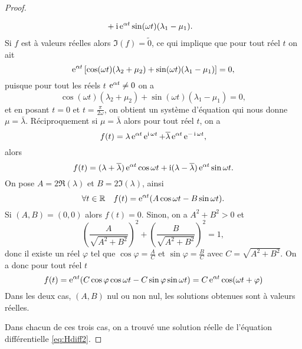 \begin{proof}
\begin{enumerate}
\begin{align}
            &+ \operatorname{i}\operatorname{e}^{\alpha t} \sin(\omega t)(\lambda_1-\mu_1).
      \end{align}
      Si \(f\) est à valeurs réelles alors \(\Im(f) = \tilde{0}\), ce qui 
      implique que pour tout réel \(t\) on ait
      \begin{equation}
        \operatorname{e}^{\alpha t} \left[ \cos(\omega t) (\lambda_2 + \mu_2)+ 
        \sin(\omega t)(\lambda_1-\mu_1)\right] = 0,
      \end{equation}
      puisque pour tout les réels \(t\) \(\operatorname{e}^{\alpha t} \neq 0\) on a
      \begin{equation}
        \cos(\omega t) (\lambda_2 + \mu_2)+ \sin(\omega t)(\lambda_1-\mu_1) = 0,
      \end{equation}
      et en posant \(t = 0\) et \(t = \frac{\pi}{2 \omega}\), on obtient 
      un système d'équation qui nous donne \(\mu = \bar{\lambda}\).
      Réciproquement si \(\mu = \bar{\lambda}\) alors pour tout réel \(t\), on a
      \begin{equation} 
        f(t) = \lambda \operatorname{e}^{\alpha t} \operatorname{e}^{\operatorname{i} \omega t} + \overline{\lambda} 
        \operatorname{e}^{\alpha t} \operatorname{e}^{-\operatorname{i}\omega t},
      \end{equation}
      alors
      \begin{equation}
        f(t) = (\lambda + \overline{\lambda}) \operatorname{e}^{\alpha t} \cos \omega t + 
        \operatorname{i}(\lambda - \overline{\lambda}) \operatorname{e}^{\alpha t}\sin \omega t.
      \end{equation}
      On pose \(A = 2 \Re(\lambda)\) et  \(B = 2\Im(\lambda)\), ainsi
      \begin{equation}
        \forall t \in \mathbb{R} \quad f(t) = \operatorname{e}^{\alpha t} (A \cos \omega t -B 
        \sin \omega t).
      \end{equation}
      Si \((A,B) = (0,0)\) alors \(f(t) = 0\). Sinon, on a \(A^2 + B^2>0\) et 
      \begin{equation}
        \left(\dfrac{A}{\sqrt{A^2 + B^2}} \right)^2 + 
        \left(\dfrac{B}{\sqrt{A^2 + B^2}} \right)^2 = 1,
      \end{equation}
      donc il existe un réel \(\varphi\) tel que \(\cos \varphi = 
      \frac{A}{C}\) et \(\sin \varphi = \frac{B}{C}\) avec \(C = \sqrt{A^2 
      + B^2}\). On a donc pour tout réel \(t\)
      \begin{equation}
        f(t) = \operatorname{e}^{\alpha t} (C \cos \varphi \cos \omega t - C \sin 
        \varphi \sin \omega t) = C \operatorname{e}^{\alpha t} \cos(\omega t + 
        \varphi)
      \end{equation}
      Dans les deux cas, \((A, B)\) nul ou non nul, les solutions obtenues 
      sont à valeurs réelles.
  \end{enumerate}
  Dans chacun de ces trois cas, on a trouvé une solution réelle de l'équation 
  différentielle \eqref{eq:Hdiff2}.
\end{proof}

